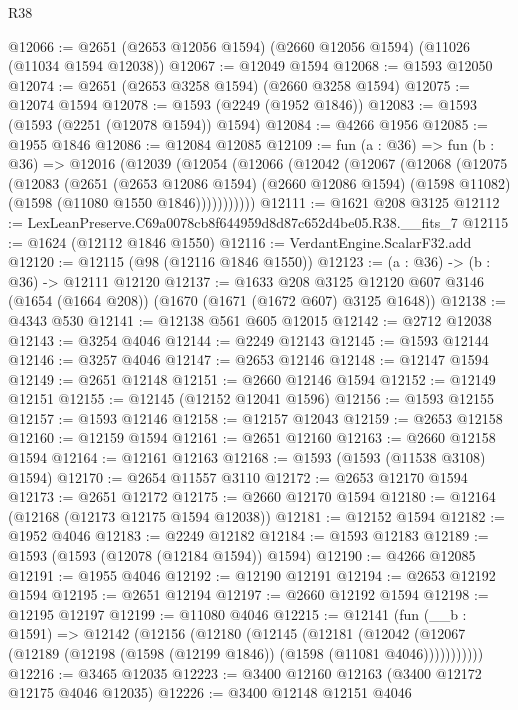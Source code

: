 \begin{lexlean}{R38}
\begin{coremodule}
@12066 := @2651 (@2653 @12056 @1594) (@2660 @12056 @1594) (@11026 (@11034 @1594 @12038))
@12067 := @12049 @1594
@12068 := @1593 @12050
@12074 := @2651 (@2653 @3258 @1594) (@2660 @3258 @1594)
@12075 := @12074 @1594
@12078 := @1593 (@2249 (@1952 @1846))
@12083 := @1593 (@1593 (@2251 (@12078 @1594)) @1594)
@12084 := @4266 @1956
@12085 := @1955 @1846
@12086 := @12084 @12085
@12109 := fun (a : @36) =>
  fun (b : @36) =>
  @12016
    (@12039
      (@12054
        (@12066
          (@12042
            (@12067
              (@12068
                (@12075
                  (@12083
                    (@2651
                      (@2653 @12086 @1594)
                      (@2660 @12086 @1594)
                      (@1598 @11082)
                      (@1598 (@11080 @1550 @1846)))))))))))
@12111 := @1621 @208 @3125
@12112 := LexLeanPreserve.C69a0078cb8f644959d8d87c652d4be05.R38.__fits_7
@12115 := @1624 (@12112 @1846 @1550)
@12116 := VerdantEngine.ScalarF32.add
@12120 := @12115 (@98 (@12116 @1846 @1550))
@12123 := (a : @36) -> (b : @36) -> @12111 @12120
@12137 := @1633
    @208
    @3125
    @12120
    @607
    @3146
    (@1654 (@1664 @208))
    (@1670 (@1671 (@1672 @607) @3125 @1648))
@12138 := @4343 @530
@12141 := @12138 @561 @605 @12015
@12142 := @2712 @12038
@12143 := @3254 @4046
@12144 := @2249 @12143
@12145 := @1593 @12144
@12146 := @3257 @4046
@12147 := @2653 @12146
@12148 := @12147 @1594
@12149 := @2651 @12148
@12151 := @2660 @12146 @1594
@12152 := @12149 @12151
@12155 := @12145 (@12152 @12041 @1596)
@12156 := @1593 @12155
@12157 := @1593 @12146
@12158 := @12157 @12043
@12159 := @2653 @12158
@12160 := @12159 @1594
@12161 := @2651 @12160
@12163 := @2660 @12158 @1594
@12164 := @12161 @12163
@12168 := @1593 (@1593 (@11538 @3108) @1594)
@12170 := @2654 @11557 @3110
@12172 := @2653 @12170 @1594
@12173 := @2651 @12172
@12175 := @2660 @12170 @1594
@12180 := @12164 (@12168 (@12173 @12175 @1594 @12038))
@12181 := @12152 @1594
@12182 := @1952 @4046
@12183 := @2249 @12182
@12184 := @1593 @12183
@12189 := @1593 (@1593 (@12078 (@12184 @1594)) @1594)
@12190 := @4266 @12085
@12191 := @1955 @4046
@12192 := @12190 @12191
@12194 := @2653 @12192 @1594
@12195 := @2651 @12194
@12197 := @2660 @12192 @1594
@12198 := @12195 @12197
@12199 := @11080 @4046
@12215 := @12141
    (fun (__b : @1591) =>
    @12142
      (@12156
        (@12180
          (@12145
            (@12181
              (@12042 (@12067 (@12189 (@12198 (@1598 (@12199 @1846)) (@1598 (@11081 @4046)))))))))))
@12216 := @3465 @12035
@12223 := @3400 @12160 @12163 (@3400 @12172 @12175 @4046 @12035)
@12226 := @3400 @12148 @12151 @4046

\end{coremodule}
\end{lexlean}
